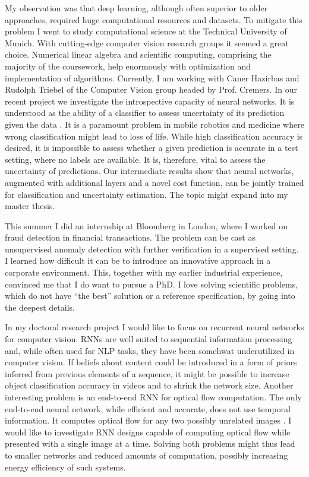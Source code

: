 \documentclass[12pt]{article}
\begin{document}
My observation was that deep learning, although often superior to older approaches, required huge computational resources and datasets. To mitigate this problem I went to study computational science at the Technical University of Munich. With cutting-edge computer vision research groups it seemed a great choice. Numerical linear algebra and scientific computing, comprising the majority of the coursework, help enormously with optimization and implementation of algorithms. Currently, I am working with Caner Hazirbas and Rudolph Triebel of the Computer Vision group headed by Prof. Cremers. In our recent project we investigate the introspective capacity of neural networks. It is understood as the ability of a classifier to assess uncertainty of its prediction given the data \cite{introspective}. It is a paramount problem in mobile robotics and medicine where wrong classification might lead to loss of life. While high classification accuracy is desired, it is impossible to assess whether a given prediction is accurate in a test setting, where no labels are available. It is, therefore, vital to assess the uncertainty of predictions. Our intermediate results show that neural networks, augmented with additional layers and a novel cost function, can be jointly trained for classification and uncertainty estimation. The topic might expand into my master thesis.

This summer I did an internship at Bloomberg in London, where I worked on fraud detection in financial transactions. The problem can be cast as unsupervised anomaly detection with further verification in a supervised setting. I learned how difficult it can be to introduce an innovative approach in a corporate environment. This, together with my earlier industrial experience, convinced me that I do want to pursue a PhD. I love solving scientific problems, which do not have ``the best'' solution or a reference specification, by going into the deepest details.

In my doctoral research project I would like to focus on recurrent neural networks for computer vision. RNNs are well suited to sequential information processing and, while often used for NLP tasks, they have been somehwat underutilized in computer vision. If beliefs about content could be introduced in a form of priors inferred from previous elements of a sequence, it might be possible to increase object classification accuracy in videos and to shrink the network size. Another interesting problem is an end-to-end RNN for optical flow computation. The only end-to-end neural network, while efficient and accurate, does not use temporal information. It computes optical flow for any two possibly unrelated images \cite{flownet}. I would like to investigate RNN designs capable of computing optical flow while presented with a single image at a time. Solving both problems might thus lead to smaller networks and reduced amounts of computation, possibly increasing energy efficiency of such systems. 
\end{document}
